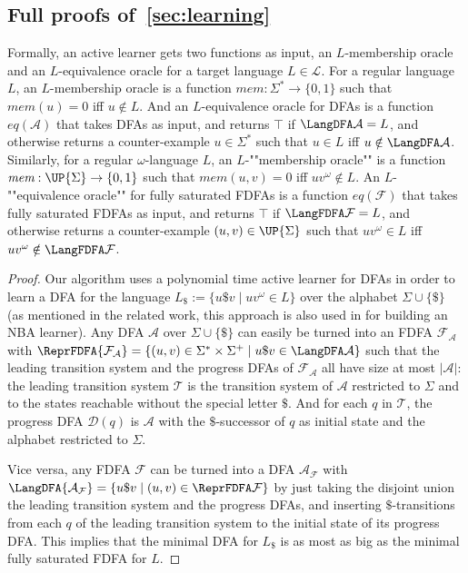 \documentclass[a4paper,USenglish,cleveref,autoref,thm-restate]{lipics-v2021}
\newcommand{\mc}[1]{\ensuremath{\mathcal{#1}}}
\newcommand{\A}{\mc{A}}
\newcommand{\T}{\mc{T}}
\newcommand{\F}{\mc{F}}
\newcommand{\D}{\mc{D}}
\renewcommand{\L}{\mc{L}}
\newcommand{\moracle}{\textit{mem}}
\newcommand{\eoracle}{\textit{eq}}
\begin{document}
{ \subsection{Full proofs of~\cref{sec:learning}}\label{section:appendixlearning}

Formally, an active learner gets two functions as input, an $L$-membership oracle and an $L$-equivalence oracle for a target language $L \in \L$. For a regular language $L$, an $L$-membership oracle is a function $\moracle:\Sigma^* \rightarrow \{0,1\}$ such that $\moracle(u) = 0$ iff $u \notin L$. And an $L$-equivalence oracle for DFAs is a function $\eoracle(\A)$ that takes DFAs as input, and returns $\top$ if $\LangDFA\A = L$, and otherwise returns a counter-example $u \in \Sigma^*$ such that $u \in L$ iff $u \notin \LangDFA\A$. Similarly, for a regular $\omega$-language $L$, an \AP $L$-""membership oracle"" is a function $\moracle: \UP{\Sigma} \rightarrow \{0,1\}$ such that $\moracle(u,v) = 0$ iff $uv^\omega \notin L$. An \AP $L$-""equivalence oracle"" for fully saturated FDFAs is a function $\eoracle(\F)$ that takes fully saturated FDFAs as input, and returns $\top$ if $\LangFDFA\F = L$, and otherwise returns a counter-example $(u,v) \in \UP{\Sigma}$ such that $uv^\omega \in L$ iff $uv^\omega \notin \LangFDFA\F$.

\activelearner*
\begin{proof}
  Our algorithm uses a polynomial time active learner for DFAs in order to learn a DFA for the language $L_\$ := \{u\$v \mid uv^\omega \in L\}$ over the alphabet $\Sigma \cup \{\$\}$ (as mentioned in the related work, this approach is also used in \cite{FarzanCCTW08} for building an NBA learner). Any DFA $\A$ over $\Sigma \cup \{\$\}$ can easily be turned into an FDFA $\F_\A$ with $\ReprFDFA{\F_\A} = \{(u,v) \in \Sigma^* \times \Sigma^+ \mid u\$v \in \LangDFA\A\}$ such that the leading transition system and the progress DFAs of $\F_\A$ all have size at most $|\A|$: the leading transition system $\T$ is the transition system of $\A$ restricted to $\Sigma$ and to the states reachable without the special letter $\$$. And for each $q$ in $\T$, the progress DFA $\D(q)$ is $\A$ with the $\$$-successor of $q$ as initial state and the alphabet restricted to $\Sigma$. 
  
  Vice versa, any FDFA $\F$ can be turned into a DFA $\A_\F$ with $\LangDFA{\A_\F} = \{u\$v \mid (u,v) \in \ReprFDFA\F\}$ by just taking the disjoint union the leading transition system and the progress DFAs, and inserting $\$$-transitions from each $q$ of the leading transition system to the initial state of its progress DFA.  This implies that the minimal DFA for $L_\$$ is as most as big as the minimal fully saturated FDFA for $L$.


\end{proof}}
\end{document}
